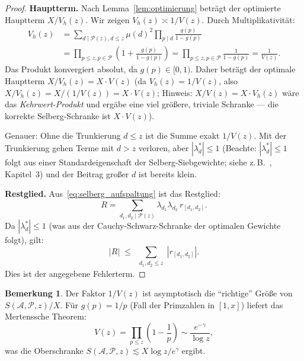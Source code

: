 \documentclass[12pt,a4paper]{amsart}
\theoremstyle{definition}
\newtheorem{bemerkung}[theorem]{Bemerkung}
\begin{document}
\begin{proof}
  \textbf{Hauptterm.}
  Nach Lemma~\ref{lem:optimierung} beträgt der optimierte Hauptterm $X/V_h(z)$.
  Wir zeigen $V_h(z) \asymp 1/V(z)$.  Durch Multiplikativität:
  \begin{align*}
    V_h(z)
    &= \sum_{d \mid \mathcal{P}(z), d \leq z} \mu(d)^2 \prod_{p \mid d} \frac{g(p)}{1-g(p)} \\
    &= \prod_{p \leq z, p \in \mathcal{P}} \left(1 + \frac{g(p)}{1-g(p)}\right)
    = \prod_{p \leq z, p \in \mathcal{P}} \frac{1}{1 - g(p)}
    = \frac{1}{V(z)}.
  \end{align*}
  Das Produkt konvergiert absolut, da $g(p) \in [0,1)$.
  Daher beträgt der optimale Hauptterm $X / V_h(z) = X \cdot V(z)$
  (da $V_h(z) = 1/V(z)$, also $X/V_h(z) = X/(1/V(z)) = X \cdot V(z)$;
  Hinweis: $X/V(z) = X \cdot V_h(z)$ wäre das \emph{Kehrwert-Produkt} und
  ergäbe eine viel größere, triviale Schranke --- die korrekte Selberg-Schranke
  ist $X \cdot V(z)$).

  Genauer: Ohne die Trunkierung $d \leq z$ ist die Summe exakt $1/V(z)$.
  Mit der Trunkierung gehen Terme mit $d > z$ verloren, aber $|\lambda_d^*| \leq 1$
  (Beachte: $|\lambda_d^*| \leq 1$ folgt aus einer Standardeigenschaft der Selberg-Siebgewichte;
  siehe z.\,B.\ \cite{CojocMurty}, Kapitel~3)
  und der Beitrag großer $d$ ist bereits klein.

  \textbf{Restglied.}
  Aus~\eqref{eq:selberg_aufspaltung} ist das Restglied:
  \[
    R = \sum_{d_1, d_2 \mid \mathcal{P}(z)} \lambda_{d_1}\lambda_{d_2}\, r_{[d_1,d_2]}.
  \]
  Da $|\lambda_d^*| \leq 1$ (was aus der Cauchy-Schwarz-Schranke der optimalen
  Gewichte folgt), gilt:
  \[
    |R| \;\leq\; \sum_{\substack{d_1, d_2 \leq z}} |r_{[d_1,d_2]}|.
  \]
  Dies ist der angegebene Fehlerterm.
\end{proof}

\begin{bemerkung}
  Der Faktor $1/V(z)$ ist asymptotisch die ``richtige'' Größe von
  $S(\mathcal{A},\mathcal{P},z)/X$.  Für $g(p) = 1/p$ (Fall der Primzahlen
  in $[1,x]$) liefert das Mertenssche Theorem:
  \[
    V(z) = \prod_{p \leq z} \left(1 - \frac{1}{p}\right) \sim \frac{e^{-\gamma}}{\log z},
  \]
  was die Oberschranke $S(\mathcal{A},\mathcal{P},z) \lesssim X \log z / e^{\gamma}$ ergibt.
\end{bemerkung}
\end{document}
